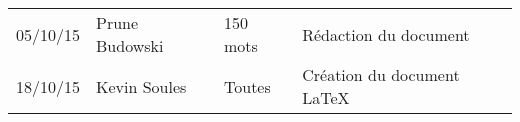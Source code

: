 \small
\begin{tabular}{|p{1.5cm}| >{\raggedright}p{2.9cm}| >{\raggedright}p{3.2cm}|p{7.2cm}|}
  \hline
  \rowcolor{Gainsboro} \color{Navy}{\bfseries Date}  & \color{Navy}{\bfseries Auteur} & \color{Navy}{\bfseries Section(s)}  &\color{Navy}{\bfseries Commentaires} \\
  \hline
  05/10/15 & Prune Budowski & 150 mots & Rédaction du document\\
  \hline
  18/10/15 & Kevin Soules & Toutes & Création du document LaTeX\\
  \hline
\end{tabular}
\normalsize
